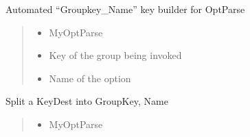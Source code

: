 \documentclass[letterpaper,10pt,english]{sphinxmanual}
\begin{document}
\begin{fulllineitems}
\begin{fulllineitems}
\begin{quote}
\begin{description}
\sphinxAtStartPar
{}

\end{description}\end{quote}

\end{fulllineitems}


\begin{fulllineitems}
\label{\detokenize{api/killMS.Parset:killMS.Parset.MyOptParse.MyOptParse.GiveKeyDest}}
\pysigstartsignatures
{}
\pysigstopsignatures
\sphinxAtStartPar
Automated “Groupkey\_Name” key builder for OptParse
\begin{quote}\begin{description}
\begin{itemize}
\item {} 
\sphinxAtStartPar
{} \textendash{} MyOptParse

\item {} 
\sphinxAtStartPar
{} \textendash{} Key of the group being invoked

\item {} 
\sphinxAtStartPar
{} \textendash{} Name of the option

\end{itemize}

\sphinxAtStartPar
{}

\end{description}\end{quote}

\end{fulllineitems}


\begin{fulllineitems}
\label{\detokenize{api/killMS.Parset:killMS.Parset.MyOptParse.MyOptParse.GiveKeysOut}}
\pysigstartsignatures
{}
\pysigstopsignatures
\sphinxAtStartPar
Split a KeyDest into GroupKey, Name
\begin{quote}\begin{description}
\begin{itemize}
\item {} 
\sphinxAtStartPar
{} \textendash{} MyOptParse


\end{itemize}
\end{description}
\end{quote}
\end{fulllineitems}
\end{fulllineitems}
\end{document}
